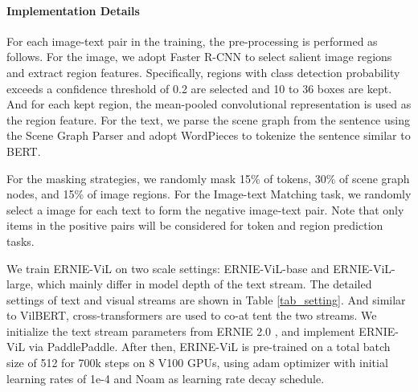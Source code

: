\documentclass[letterpaper]{article} \usepackage{aaai21}  \usepackage{times}  \usepackage{helvet} \usepackage{courier}  \usepackage[hyphens]{url}  \usepackage{graphicx} \urlstyle{rm} \def\UrlFont{\rm}  \usepackage{natbib}  \usepackage{caption} \frenchspacing  \setlength{\pdfpagewidth}{8.5in}  \setlength{\pdfpageheight}{11in}  \usepackage{cite}
\begin{document}
\paragraph{Implementation Details}  
For each image-text pair in the training, the pre-processing is performed as follows. For the image, we adopt Faster R-CNN \cite{anderson2018bottom} to select salient image regions and extract region features. Specifically, regions with class detection probability exceeds a confidence threshold of 0.2 are selected and 10 to 36 boxes  are kept. And for each kept region, the mean-pooled convolutional representation  is used as the region feature. For the text, we parse the scene graph from the sentence using the Scene Graph Parser and adopt WordPieces to tokenize the sentence similar to BERT.

For the masking strategies, we randomly mask 15\% of tokens, 30\% of scene graph nodes, and 15\% of image regions. For the Image-text Matching task, we randomly select a image for each text to form the negative image-text pair. Note that only items in the positive pairs will be considered for token and region prediction tasks.

We train ERNIE-ViL on two scale settings: ERNIE-ViL-base and ERNIE-ViL-large, which mainly differ in model depth of the text stream. The detailed settings of text and visual streams are shown in Table \ref{tab_setting}. And similar to VilBERT\cite{lu2019vilbert}, cross-transformers are used to co-at tent the two streams. We initialize the text stream parameters from ERNIE 2.0 \cite{sun2019ernie2}, and implement ERNIE-ViL via PaddlePaddle. After then, ERINE-ViL is pre-trained on a total batch size of 512 for  700k steps on 8 V100 GPUs, using adam optimizer with initial learning rates of 1e-4 and Noam \cite{vaswani2017attention} as learning rate decay schedule.

\begin{table}[t]
\centering
{}
\caption{Settings for ERNIE-ViL model. : number of layers,  : hidden size,  : number of self-attention heads,  : feed-forward/filter size.}
\label{tab_setting}

\end{table}
\end{document}
